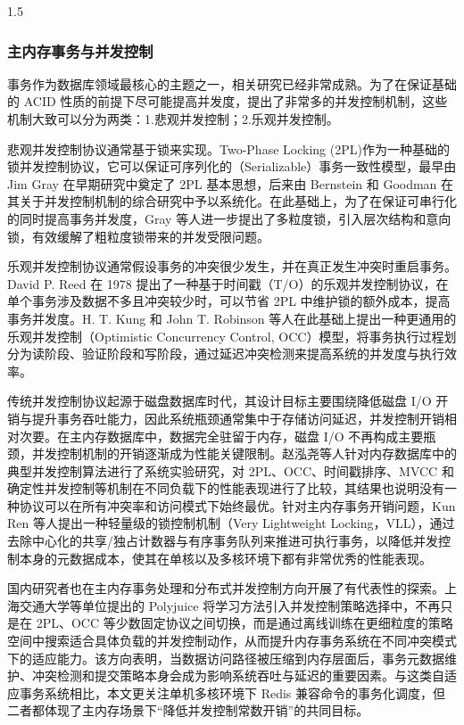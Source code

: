 \documentclass[a4paper,12pt,fontset=none,twoside]{article}
\numberwithin{figure}{section}
\numberwithin{equation}{section}
\numberwithin{table}{section}
\begin{document}
\begin{spacing}{1.5}
	\subsubsection{主内存事务与并发控制}
	事务作为数据库领域最核心的主题之一，相关研究已经非常成熟。为了在保证基础的 ACID 性质的前提下尽可能提高并发度，提出了非常多的并发控制机制，这些机制大致可以分为两类：1.悲观并发控制；2.乐观并发控制。
	
	悲观并发控制协议通常基于锁来实现。Two-Phase Locking (2PL)作为一种基础的锁并发控制协议，它可以保证可序列化的（Serializable）事务一致性模型，最早由 Jim Gray 在早期研究中奠定了 2PL 基本思想，后来由 Bernstein 和 Goodman 在其关于并发控制机制的综合研究中予以系统化\cite{Concurrency-Control-in-Distributed-Database-Systems}。在此基础上，为了在保证可串行化的同时提高事务并发度，Gray 等人进一步提出了多粒度锁\cite{Granularity-of-locks-in-a-shared-data-base}，引入层次结构和意向锁，有效缓解了粗粒度锁带来的并发受限问题。

	乐观并发控制协议通常假设事务的冲突很少发生，并在真正发生冲突时重启事务。David P. Reed 在 1978 提出了一种基于时间戳（T/O）的乐观并发控制协议\cite{NAMING-AND-SYNCHRONIZATION-IN-A-DECENTRALIZED-COMPUTER-SYSTEM}，在单个事务涉及数据不多且冲突较少时，可以节省 2PL 中维护锁的额外成本，提高事务并发度。H. T. Kung 和 John T. Robinson 等人在此基础上提出一种更通用的乐观并发控制（Optimistic Concurrency Control, OCC）模型\cite{On-optimistic-methods-for-concurrency-control}，将事务执行过程划分为读阶段、验证阶段和写阶段，通过延迟冲突检测来提高系统的并发度与执行效率。

	传统并发控制协议起源于磁盘数据库时代，其设计目标主要围绕降低磁盘 I/O 开销与提升事务吞吐能力，因此系统瓶颈通常集中于存储访问延迟，并发控制开销相对次要。在主内存数据库中，数据完全驻留于内存，磁盘 I/O 不再构成主要瓶颈，并发控制机制的开销逐渐成为性能关键限制。赵泓尧等人针对内存数据库中的典型并发控制算法进行了系统实验研究，对 2PL、OCC、时间戳排序、MVCC 和确定性并发控制等机制在不同负载下的性能表现进行了比较\cite{Zhao2022ConcurrencyControlExperiment}，其结果也说明没有一种协议可以在所有冲突率和访问模式下始终最优。针对主内存事务开销问题，Kun Ren 等人提出一种轻量级的锁控制机制（Very Lightweight Locking，VLL）\cite{VLL}，通过去除中心化的共享/独占计数器与有序事务队列来推进可执行事务，以降低并发控制本身的元数据成本，使其在单核以及多核环境下都有非常优秀的性能表现。

	国内研究者也在主内存事务处理和分布式并发控制方向开展了有代表性的探索。上海交通大学等单位提出的 Polyjuice\cite{Polyjuice} 将学习方法引入并发控制策略选择中，不再只是在 2PL、OCC 等少数固定协议之间切换，而是通过离线训练在更细粒度的策略空间中搜索适合具体负载的并发控制动作，从而提升内存事务系统在不同冲突模式下的适应能力。该方向表明，当数据访问路径被压缩到内存层面后，事务元数据维护、冲突检测和提交策略本身会成为影响系统吞吐与延迟的重要因素。与这类自适应事务系统相比，本文更关注单机多核环境下 Redis 兼容命令的事务化调度，但二者都体现了主内存场景下“降低并发控制常数开销”的共同目标。


\end{spacing}
\end{document}
